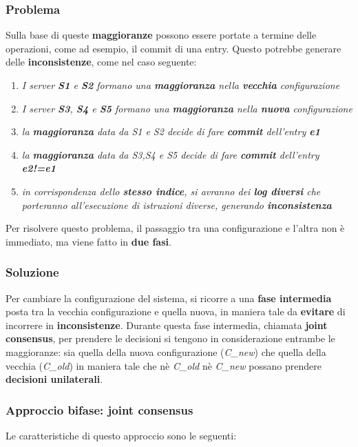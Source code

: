   \subsubsection{Problema}
    Sulla base di queste \textbf{maggioranze} possono essere portate a termine delle operazioni, come ad esempio, il commit  di una entry. Questo potrebbe generare delle \textbf{inconsistenze}, come nel caso seguente:
  \begin{enumerate}
    \item{\emph{I server \textbf{S1} e \textbf{S2} formano una \textbf{maggioranza} nella \textbf{vecchia} configurazione}}
    \item{\emph{I server \textbf{S3}, \textbf{S4} e \textbf{S5} formano una \textbf{maggioranza} nella \textbf{nuova} configurazione}}
    \item{\emph{la \textbf{maggioranza} data da S1 e S2 decide di fare \textbf{commit} dell'entry \textbf{e1}}}
    \item{\emph{la \textbf{maggioranza} data da S3,S4 e S5 decide di fare \textbf{commit} dell'entry \textbf{e2!=e1}}}
    \item{\emph{in corrispondenza dello \textbf{stesso indice}, si avranno dei \textbf{log diversi} che porteranno all'esecuzione di istruzioni diverse, generando \textbf{inconsistenza}}}
  \end{enumerate}

  Per risolvere questo problema, il passaggio tra una configurazione e l'altra non è immediato, ma viene fatto in \textbf{due fasi}.
    


  \subsubsection{Soluzione}   

    Per cambiare la configurazione del sistema, si ricorre a una \textbf{fase intermedia} posta tra la vecchia configurazione e quella nuova, in maniera tale da \textbf{evitare} di incorrere in \textbf{inconsistenze}.
    Durante questa fase intermedia, chiamata \textbf{joint consensus}, per prendere le decisioni si tengono in considerazione entrambe le maggioranze: sia quella della nuova configurazione (\textit{C\_new}) che quella della vecchia (\textit{C\_old}) in maniera tale che nè \textit{C\_old} nè \textit{C\_new} possano prendere \textbf{decisioni unilaterali}.

    \subsubsection{Approccio bifase: joint consensus}
    Le caratteristiche di questo approccio sono le seguenti:
    
